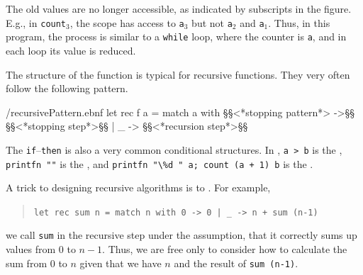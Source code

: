 \documentclass[fsharpNotes.tex]{subfiles}
\begin{document}
The old values are no longer accessible, as indicated by subscripts in the figure. E.g., in \lstinline{count}$_3$, the scope has access to \lstinline{a}$_3$ but not \lstinline{a}$_2$ and \lstinline{a}$_1$. Thus, in this program, the process is similar to a \lstinline{while} loop, where the counter is \lstinline{a}, and in each loop its value is reduced.

The structure of the function is typical for recursive functions. They very often follow the following pattern.
\begin{verbatimwrite}{\ebnf/recursivePattern.ebnf}
let rec f a =
  match a with
    §§<*stopping pattern*> ->§§
      §§<*stopping step*>§§
    | _ ->
      §§<*recursion step*>§§
\end{verbatimwrite}
%
The \lstinline{if}--\lstinline{then} is also a very common conditional structures. In , \lstinline{a > b} is the , \lstinline{printfn ""} is the , and \lstinline{printfn "\%d " a; count (a + 1) b} is the .

A trick to designing recursive algorithms is to . For example,
\begin{quote}
\lstinline{let rec sum n = match n with 0 -> 0 | _ -> n + sum (n-1)}
\end{quote}
we call \lstinline{sum} in the recursive step under the assumption, that it correctly sums up values from 0 to $n-1$. Thus, we are free only to consider how to calculate the sum from 0 to $n$ given that we have $n$ and the result of \lstinline{sum (n-1)}.
\end{document}
